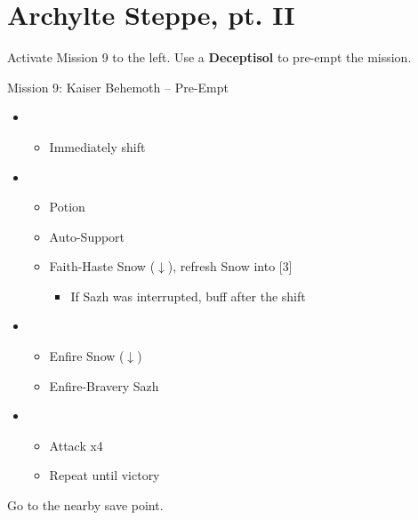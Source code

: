 \chapter{Archylte Steppe, pt. II}

Activate Mission 9 to the left.
Use a \textbf{Deceptisol} to pre-empt the mission.

\begin{battle}{Mission 9: Kaiser Behemoth -- Pre-Empt}
	\begin{itemize}
		\item \sixth
			\begin{itemize}
				\item Immediately shift
			\end{itemize}
		\item \fourth
			\begin{itemize}
				\item Potion
				\item Auto-Support
				\item Faith-Haste Snow ($\downarrow$), refresh Snow into [3]
					\begin{itemize}
						\item If Sazh was interrupted, buff after the shift
					\end{itemize}
			\end{itemize}
		\item \first
			\begin{itemize}
				\item Enfire Snow ($\downarrow$)
				\item Enfire-Bravery Sazh
			\end{itemize}
		\item \fifth
			\begin{itemize}
				\item Attack x4
				\item Repeat until victory
			\end{itemize}
	\end{itemize}
\end{battle}

Go to the nearby save point.

